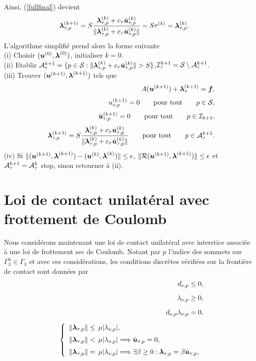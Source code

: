 \noindent Ainsi, (\ref{fullfinal}) devient 
\begin{align}
&\mbox{\boldmath{$\lambda$}}_{\tau, p}^{(k+1)}=  S\frac{\mbox{\boldmath{$\lambda$}}_{\tau, p}^{(k)}+c_\tau \dot{\mbox{\boldmath{$u$}}}_{\tau, p}^{(k)}}{\|\mbox{\boldmath{$\lambda$}}_{\tau, p}^{(k)}+c_\tau \dot{\mbox{\boldmath{$u$}}}_{\tau, p}^{(k)}\|} =S\tau^{(k)} = \mbox{\boldmath{$\lambda$}}^{(k)}_{\tau, p}.\nonumber
\end{align}
L'algorithme simplifié prend alors la forme suivante\\
\noindent
\qquad(i) Choisir $(\mbox{\boldmath{$u$}}^{(0)},\mbox{\boldmath{$\lambda$}}^{(0)})$, initialiser $k=0$.\\[1mm]
\qquad(ii) Etablir ${\cal A}^{k+1}_\tau=\{p\in {\cal S}:\|\blambda_{\tau, p}^{(k)}+c_\tau \dot\bu_{\tau, p}^{(k)}\|> S\}$,\quad  ${\cal I}^{k+1}_\tau={\cal S}\setminus {\cal A}^{k+1}_\tau$.\\[1mm]
\qquad(iii) Trouver $(\mbox{\boldmath{$u$}}^{(k+1) },\mbox{\boldmath{$\lambda$}}^{(k+1) })$ tels que
\begin{eqnarray}
&&A(\mbox{\boldmath{$u$}}^{(k+1)}) + \mbox{\boldmath{$\lambda$}}_{\tau}^{(k+1)}= \mbox{\boldmath{$f$}},\nonumber\\[1mm]
&& u^{(k+1)}_{\nu,p}=0 \qquad {\rm pour \ tout} \qquad p\in {\cal S}\nonumber,\\[1mm]
&&\dot{\mbox{\boldmath{$u$}}}^{(k+1)}_{\tau,p}=0 \qquad {\rm pour \ tout} \qquad p\in {\cal I}_{k+1},\nonumber\\[1mm]
&&\mbox{\boldmath{$\lambda$}}_{\tau, p}^{(k+1)}=  S\frac{\mbox{\boldmath{$\lambda$}}_{\tau, p}^{(k)}+c_\tau \dot{\mbox{\boldmath{$u$}}}_{\tau, p}^{(k)}}{\|\mbox{\boldmath{$\lambda$}}_{\tau, p}^{(k)}+c_\tau \dot{\mbox{\boldmath{$u$}}}_{\tau, p}^{(k)}\|} \qquad {\rm pour \ tout} \qquad p\in {\cal A}^{k+1}_\tau.\nonumber
\end{eqnarray}
\noindent
\qquad(iv) Si $\|(\mbox{\boldmath{$u$}}^{(k+1) },\mbox{\boldmath{$\lambda$}}^{(k+1)})-(\mbox{\boldmath{$u$}}^{(k) },\mbox{\boldmath{$\lambda$}}^{(k)})\|\leq\epsilon$, $\|{\cal R}(\mbox{\boldmath{$u$}}^{(k+1) },\mbox{\boldmath{$\lambda$}}^{(k+1)})\|\leq\epsilon$ et ${\cal A}^{k+1}_\tau={\cal A}^{k}_\tau$ stop, sinon retourner à (ii).

\section{Loi de contact unilatéral avec frottement de Coulomb}
\label{coulombactive}
Nous considérons maintenant une loi de contact unilatéral avec interstice associée à une loi de frottement sec de Coulomb.
Notant par $p$ l'indice des sommets sur $\Gamma_3^h\in \Gamma_3$ et avec ces considérations, les conditions discrètes vérifiées sur la frontière de contact sont données par
\begin{eqnarray}
&&\label{1nudc}d_{\nu,p}\le 0,\\[2mm]
&&\label{1lmbnudc}\lambda_{\nu, p}\ge 0,\\[2mm]
&&\label{1unulmbddc}d_{\nu,p}\lambda_{\nu, p}= 0,\\[2mm]
&&\label{fricdc} \left\{\begin{array}{ll}
\|\mbox{\boldmath{$\lambda$}}_{\tau, p}\|\le\,\mu |\lambda_{\nu, p}|,\\[2mm]
\|\mbox{\boldmath{$\lambda$}}_{\tau, p}\|<\,\mu |\lambda_{\nu, p}|\Longrightarrow \dot{\mbox{\boldmath{$u$}}}_{\tau, p}=0,\\[2mm]
\|\mbox{\boldmath{$\lambda$}}_{\tau, p}\|=\,\mu |\lambda_{\nu, p}|\Longrightarrow \exists \beta\ge 0: \mbox{\boldmath{$\lambda$}}_{\tau, p}=\beta \dot{\mbox{\boldmath{$u$}}}_{\tau, p},
\end{array}\right.
\end{eqnarray}

